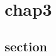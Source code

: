 \documentclass[10pt,a4j,openany,dvipdfmx]{jsbook}
\begin{document}
\chapter{chap3} %
\label{cha:chap3}

\section{section} %
\label{sec:section}




\end{document}
